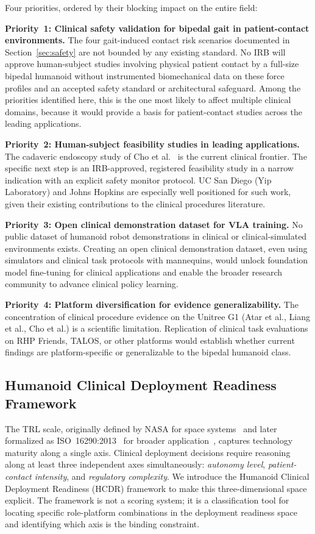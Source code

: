 \documentclass[acmsmall]{acmart}
\begin{document}
Four priorities, ordered by their blocking impact on the entire field:

\textbf{Priority~1: Clinical safety validation for bipedal gait in patient-contact
environments.} The four gait-induced contact risk scenarios documented in
Section~\ref{sec:safety} are not bounded by any existing standard. No IRB will
approve human-subject studies involving physical patient contact by a full-size
bipedal humanoid without instrumented biomechanical data on these force profiles
and an accepted safety standard or architectural safeguard. Among the priorities
identified here, this is the one most likely to affect multiple clinical domains,
because it would provide a basis for patient-contact studies across the leading
applications.

\textbf{Priority~2: Human-subject feasibility studies in leading applications.}
The cadaveric endoscopy study of Cho et al.~\cite{cho2026humanoid} is the current
clinical frontier. The specific next step is an IRB-approved, registered
feasibility study in a narrow indication with an explicit safety monitor protocol.
UC San Diego (Yip Laboratory) and Johns Hopkins are especially well positioned
for such work, given their existing contributions to the clinical procedures
literature.

\textbf{Priority~3: Open clinical demonstration dataset for VLA training.} No
public dataset of humanoid robot demonstrations in clinical or
clinical-simulated environments exists. Creating an open clinical demonstration
dataset, even using simulators and clinical task protocols with mannequins, would
unlock foundation model fine-tuning for clinical applications and enable the
broader research community to advance clinical policy learning.

\textbf{Priority~4: Platform diversification for evidence generalizability.} The
concentration of clinical procedure evidence on the Unitree G1 (Atar et al., Liang et al., Cho et al.) is a
scientific limitation. Replication of clinical task evaluations on RHP Friends,
TALOS, or other platforms would establish whether current findings are
platform-specific or generalizable to the bipedal humanoid class.

\subsection{Humanoid Clinical Deployment Readiness Framework}
\label{sec:hcdr}

The TRL scale, originally defined by NASA for space systems~\cite{mankins1995trl}
and later formalized as ISO~16290:2013~\cite{iso16290} for broader
application~\cite{heder2017trl}, captures technology maturity along a single
axis. Clinical deployment decisions require reasoning along at least three
independent axes simultaneously: \emph{autonomy level}, \emph{patient-contact intensity}, and
\emph{regulatory complexity}. We introduce the Humanoid Clinical Deployment
Readiness (HCDR) framework to make this three-dimensional space explicit. The
framework is not a scoring system; it is a classification tool for locating
specific role-platform combinations in the deployment readiness space and
identifying which axis is the binding constraint.
\end{document}
